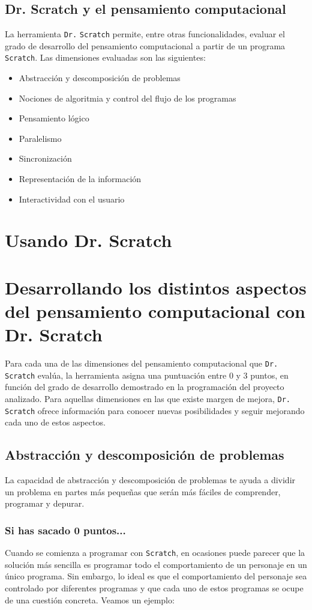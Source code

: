 \documentclass[a4paper,10pt]{article}
\begin{document}
\subsection*{Dr. Scratch y el pensamiento computacional}
La herramienta \texttt{Dr.}{\tiny{ }}\texttt{Scratch} permite, entre otras funcionalidades, evaluar el grado de desarrollo del pensamiento computacional a partir de un programa \texttt{Scratch}. Las dimensiones evaluadas son las siguientes:
\begin{itemize}
 \item Abstracción y descomposición de problemas
 \item Nociones de algoritmia y control del flujo de los programas
 \item Pensamiento lógico
 \item Paralelismo
 \item Sincronización
 \item Representación de la información
 \item Interactividad con el usuario
\end{itemize}

\section{Usando Dr. Scratch}

\section{Desarrollando los distintos aspectos del pensamiento computacional con Dr. Scratch}
Para cada una de las dimensiones del pensamiento computacional que \texttt{Dr.}{\tiny{ }}\texttt{Scratch} evalúa, la herramienta asigna una puntuación entre 0 y 3 puntos, en función del grado de desarrollo demostrado en la programación del proyecto analizado. Para aquellas dimensiones en las que existe margen de mejora, \texttt{Dr.}{\tiny{ }}\texttt{Scratch} ofrece información para conocer nuevas posibilidades y seguir mejorando cada uno de estos aspectos.
\subsection{Abstracción y descomposición de problemas}
La capacidad de abstracción y descomposición de problemas te ayuda a dividir un problema en partes más pequeñas que serán más fáciles de comprender, programar y depurar.
\subsubsection{Si has sacado 0 puntos...}
Cuando se comienza a programar con \texttt{Scratch}, en ocasiones puede parecer que la solución más sencilla es programar todo el comportamiento de un personaje en un único programa. Sin embargo, lo ideal es que el comportamiento del personaje sea controlado por diferentes programas y que cada uno de estos programas se ocupe de una cuestión concreta. Veamos un ejemplo:
\end{document}
